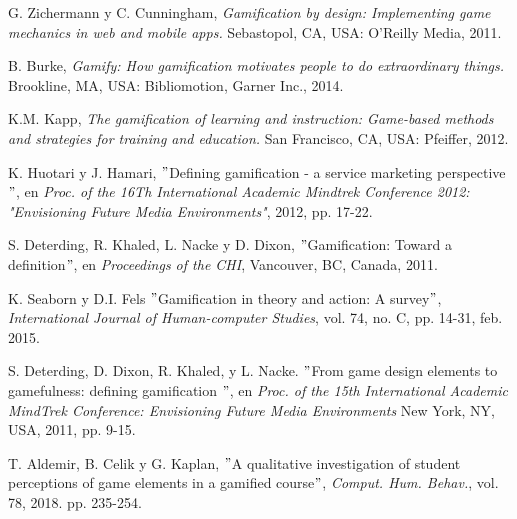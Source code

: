 
\begin{thebibliography}{9}

        G. Zichermann y C. Cunningham,
        \textit{Gamification by design: Implementing game mechanics in web and mobile apps.}
        Sebastopol, CA, USA: O'Reilly Media, 2011.
        
        B. Burke,
        \textit{Gamify: How gamification motivates people to do extraordinary things.}
        Brookline, MA, USA: Bibliomotion, Garner Inc., 2014.
        
        K.M. Kapp,
        \textit{The gamification of learning and instruction: Game-based methods and strategies for training and education.}
        San Francisco, CA, USA: Pfeiffer, 2012.
        
        K. Huotari y J. Hamari,
        $"$Defining gamification - a service marketing perspective$"$, en
        \textit{Proc. of the 16Th International Academic Mindtrek Conference 2012: "Envisioning Future Media Environments"}, 2012, pp. 17-22.
    
        S. Deterding, R. Khaled, L. Nacke y D. Dixon,
        $"$Gamification: Toward a definition$"$, en
        \textit{Proceedings of the CHI}, Vancouver, BC, Canada, 2011.
        
        K. Seaborn y D.I. Fels
        $"$Gamification in theory and action: A survey$"$,
        \textit{International Journal of Human-computer Studies}, vol. 74, no. C, pp. 14-31, feb. 2015.
        
        S. Deterding, D. Dixon, R. Khaled, y L. Nacke.
        $"$From game design elements to gamefulness: defining gamification $"$, en \textit{ Proc. of the 15th International Academic MindTrek Conference: Envisioning Future Media Environments} New York, NY, USA, 2011, pp. 9-15. 
        
        T. Aldemir, B. Celik y G. Kaplan, 
        $"$A qualitative investigation of student perceptions of game elements in a gamified course$"$,
        \textit{Comput. Hum. Behav.}, vol. 78, 2018. pp. 235-254.
        

\end{thebibliography}
